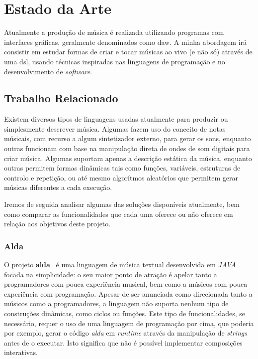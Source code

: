\chapter{Estado da Arte}
Atualmente a produção de música é realizada utilizando programas com interfaces gráficas, geralmente denominados como \acrfull{daw}. A minha abordagem irá consistir em estudar formas de criar e tocar músicas ao vivo (e não só) através de uma \acrfull{dsl}, usando técnicas inspiradas nas linguagens de programação e no desenvolvimento de \textit{software}.

\section{Trabalho Relacionado}
Existem diversos tipos de linguagens usadas atualmente para produzir ou simplesmente descrever música. Algumas fazem uso do conceito de notas músicais, com recurso a algum sintetizador externo, para gerar os sons, enquanto outras funcionam com base na manipulação direta de ondes de som digitais para criar música. Algumas suportam apenas a descrição estática da música, enquanto outras permitem formas dinâmicas tais como funções, variáveis, estruturas de controlo e repetição, ou até mesmo algorítmos aleatórios que permitem gerar músicas diferentes a cada execução.

Iremos de seguida analisar algumas das soluções disponíveis atualmente, bem como comparar as funcionalidades que cada uma oferece ou não oferece em relação aos objetivos deste projeto.
\subsection{Alda}
O projeto \textbf{alda}~\cite{alda} é uma linguagem de música textual desenvolvida em \textit{JAVA} focada na simplicidade: o seu maior ponto de atração é apelar tanto a programadores com pouca experiência musical, bem como a músicos com pouca experiência com programação.
Apesar de ser anunciada como direcionada tanto a músicos como a programadores, a linguagem não suporta nenhum tipo de construções dinâmicas, como ciclos ou funções. Este tipo de funcionalidades, se necessário, requer o uso de uma linguagem de programação por cima, que poderia por exemplo, gerar o código \textit{alda} em \textit{runtime} através da manipulação de \textit{strings} antes de o executar. Isto significa que não é possível implementar composições interativas.

